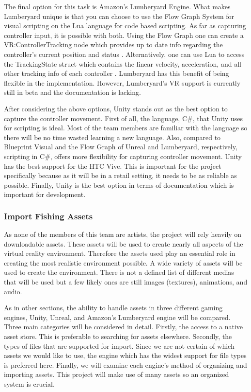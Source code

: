 \documentclass[10pt,journal,compsoc,onecolumn, draftclsnofoot]{IEEEtran}
\begin{document}
The final option for this task is Amazon's Lumberyard Engine.
What makes Lumberyard unique is that you can choose to use the Flow Graph System for visual scripting on the Lua language for code based scripting.
As far as capturing controller input, it is possible with both.
Using the Flow Graph one can create a VR:ControllerTracking node which provides up to date info regarding the controller's current position and status \cite{lumberyard_controller_flow}.
Alternatively, one can use Lua to access the TrackingState struct which contains the linear velocity, acceleration, and all other tracking info of each controller \cite{lumberyard_controller_lua}.
Lumberyard has this benefit of being flexible in the implementation.
However, Lumberyard's VR support is currently still in beta and the documentation is lacking.

After considering the above options, Unity stands out as the best option to capture the controller movement.
First of all, the language, C\#, that Unity uses for scripting is ideal.
Most of the team members are familiar with the language so there will be no time wasted learning a new language.
Also, compared to Blueprint Visual and the Flow Graph of Unreal and Lumberyard, respectively, scripting in C\#, offers more flexibility for capturing controller movement.
Unity has the best support for the HTC Vive.
This is important for the project specifically because as it will be in a retail setting, it needs to be as reliable as possible.
Finally, Unity is the best option in terms of documentation which is important for development.

\subsubsection{Import Fishing Assets}
As none of the members of this team are artists, the project will rely heavily on downloadable assets.
These assets will be used to create nearly all aspects of the virtual reality environment.
Therefore the assets used play an essential role in creating the most realistic environment possible.
A wide variety of assets will be used to create the environment.
There is not a defined list of different medias that will be used but a few likely ones are still images (textures), animations, and audio.

As in other sections, the ability to handle assets in three different gaming engines, Unity, Unreal, and Amazon's Lumberyard engine will be compared.
Three main categories will be considered in detail.
Firstly, the access to a native asset store.
This is preferable to searching for assets elsewhere.
Secondly, the types of files that are supported for import.
Since we are not certain of which assets we would like to use, the engine which has the widest support for file types is preferred here.
Finally, we will examine each engine's method of organizing and importing assets.
This project will make use of many assets so an organized system is crucial.
\end{document}
